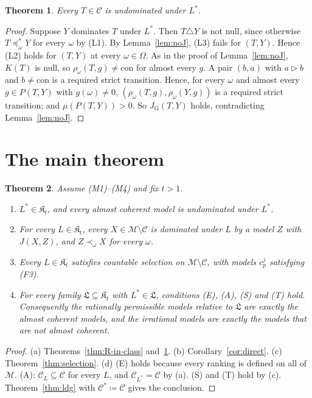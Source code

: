 \documentclass[11pt]{article}
\newtheorem{theorem}{Theorem}[section]
\theoremstyle{definition}
\newcommand{\M}{\mathcal M}
\newcommand{\C}{\mathcal C}
\newcommand{\K}{\mathfrak K}
\newcommand{\Lf}{\mathfrak L}
\newcommand{\con}{\mathrm{con}}
\newcommand{\GU}{\mathrm{G}}
\begin{document}
\begin{theorem}\label{thm:protection}
Every $T\in\C$ is undominated under $L^\ast$.
\end{theorem}

\begin{proof}
Suppose $Y$ dominates $T$ under $L^\ast$. Then $T\triangle Y$ is not null, since otherwise $T\preceq^\ast_\omega Y$ for every $\omega$ by (L1). By Lemma~\ref{lem:noJ}, (L3) fails for $(T,Y)$. Hence (L2) holds for $(T,Y)$ at every $\omega\in\Omega$. As in the proof of Lemma~\ref{lem:noJ}, $K(T)$ is null, so $\rho_\omega(T,g)\ne\con$ for almost every $g$. A pair $(b,a)$ with $a\rhd b$ and $b\ne\con$ is a required strict transition. Hence, for every $\omega$ and almost every $g\in P(T,Y)$ with $g(\omega)\ne0$, $(\rho_\omega(T,g),\rho_\omega(Y,g))$ is a required strict transition; and $\mu(P(T,Y))>0$. So $J_\GU(T,Y)$ holds, contradicting Lemma~\ref{lem:noJ}.
\end{proof}

\section{The main theorem}\label{sec:main}

\begin{theorem}\label{thm:main}
Assume (M1)--(M4) and fix $t>1$.
\begin{enumerate}[label=(\alph*)]
\item $L^\ast\in\K_t$, and every almost coherent model is undominated under $L^\ast$.
\item For every $L\in\K_t$, every $X\in\M\setminus\C$ is dominated under $L$ by a model $Z$ with $J(X,Z)$, and $Z\prec_\omega X$ for every $\omega$.
\item Every $L\in\K_t$ satisfies countable selection on $\M\setminus\C$, with models $c^j_p$ satisfying (F3).
\item For every family $\Lf\subseteq\K_t$ with $L^\ast\in\Lf$, conditions (E), (A), (S) and (T) hold. Consequently the rationally permissible models relative to $\Lf$ are exactly the almost coherent models, and the irrational models are exactly the models that are not almost coherent.
\end{enumerate}
\end{theorem}

\begin{proof}
(a) Theorems~\ref{thm:R-in-class} and~\ref{thm:protection}. (b) Corollary~\ref{cor:direct}. (c) Theorem~\ref{thm:selection}. (d) (E) holds because every ranking is defined on all of $\M$. (A): $\C_L\subseteq\C$ for every $L$, and $\C_{L^\ast}=\C$ by (a). (S) and (T) hold by (c). Theorem~\ref{thm:ldg} with $\C^\ast\coloneqq\C$ gives the conclusion.
\end{proof}
\end{document}
